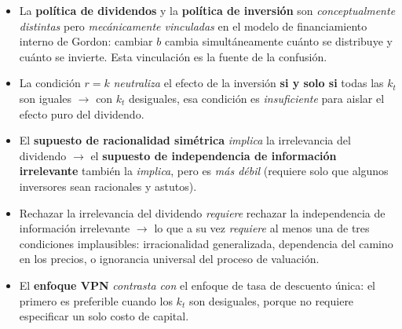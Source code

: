 \documentclass[12pt]{article}
\begin{document}
\begin{itemize}
  \item La \textbf{pol\'itica de dividendos} y la \textbf{pol\'itica de inversi\'on} son \textit{conceptualmente distintas} pero \textit{mec\'anicamente vinculadas} en el modelo de financiamiento interno de Gordon: cambiar $b$ cambia simult\'aneamente cu\'anto se distribuye y cu\'anto se invierte. Esta vinculaci\'on es la fuente de la confusi\'on.
  \item La condici\'on $r = k$ \textit{neutraliza} el efecto de la inversi\'on \textbf{si y solo si} todas las $k_t$ son iguales $\rightarrow$ con $k_t$ desiguales, esa condici\'on es \textit{insuficiente} para aislar el efecto puro del dividendo.
  \item El \textbf{supuesto de racionalidad sim\'etrica} \textit{implica} la irrelevancia del dividendo $\rightarrow$ el \textbf{supuesto de independencia de informaci\'on irrelevante} tambi\'en la \textit{implica}, pero es \textit{m\'as d\'ebil} (requiere solo que algunos inversores sean racionales y astutos).
  \item Rechazar la irrelevancia del dividendo \textit{requiere} rechazar la independencia de informaci\'on irrelevante $\rightarrow$ lo que a su vez \textit{requiere} al menos una de tres condiciones implausibles: irracionalidad generalizada, dependencia del camino en los precios, o ignorancia universal del proceso de valuaci\'on.
  \item El \textbf{enfoque VPN} \textit{contrasta con} el enfoque de tasa de descuento \'unica: el primero es preferible cuando los $k_t$ son desiguales, porque no requiere especificar un solo costo de capital.
\end{itemize}
\end{document}

